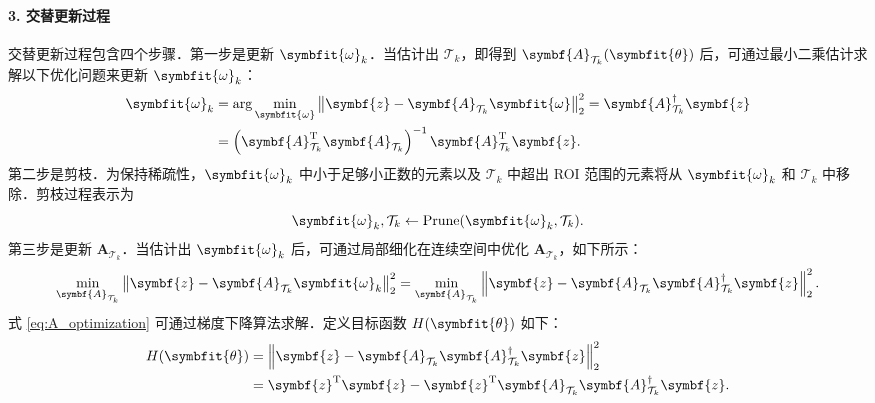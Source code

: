 \documentclass[a4paper,zihao=-4]{ctexart}
\renewcommand{\mathbf}[1]{\symbf{#1}}
\renewcommand{\boldsymbol}[1]{\symbfit{#1}}
\begin{document}
\paragraph{3. 交替更新过程}
交替更新过程包含四个步骤．第一步是更新 $\boldsymbol{\omega}_k$．当估计出 $\mathcal{T}_k$，即得到 $\mathbf{A}_{\mathcal{T}_k}(\boldsymbol{\theta})$ 后，可通过最小二乘估计求解以下优化问题来更新 $\boldsymbol{\omega}_k$：
\begin{equation}
    \label{eq:omega_update}
    \begin{aligned}
        \boldsymbol{\omega}_k &= \arg\min_{\boldsymbol{\omega}} \left\| \mathbf{z} - \mathbf{A}_{\mathcal{T}_k} \boldsymbol{\omega} \right\|_2^2 = \mathbf{A}_{\mathcal{T}_k}^{\dagger} \mathbf{z} \\
        &= \left( \mathbf{A}_{\mathcal{T}_k}^{\mathrm{T}} \mathbf{A}_{\mathcal{T}_k} \right)^{-1} \mathbf{A}_{\mathcal{T}_k}^{\mathrm{T}} \mathbf{z}.
    \end{aligned}
\end{equation}
第二步是剪枝．为保持稀疏性，$\boldsymbol{\omega}_k$ 中小于足够小正数的元素以及 $\mathcal{T}_k$ 中超出 ROI 范围的元素将从 $\boldsymbol{\omega}_k$ 和 $\mathcal{T}_k$ 中移除．剪枝过程表示为
\begin{equation}
    \label{eq:prune}
    \boldsymbol{\omega}_k, \mathcal{T}_k \leftarrow \operatorname{Prune}(\boldsymbol{\omega}_k, \mathcal{T}_k).
\end{equation}
第三步是更新 $\mathbf{A}_{\mathcal{T}_k}$．当估计出 $\boldsymbol{\omega}_k$ 后，可通过局部细化在连续空间中优化 $\mathbf{A}_{\mathcal{T}_k}$，如下所示：
\begin{equation}
    \label{eq:A_optimization}
    \min_{\mathbf{A}_{\mathcal{T}_k}} \left\| \mathbf{z} - \mathbf{A}_{\mathcal{T}_k} \boldsymbol{\omega}_k \right\|_2^2 = \min_{\mathbf{A}_{\mathcal{T}_k}} \left\| \mathbf{z} - \mathbf{A}_{\mathcal{T}_k} \mathbf{A}_{\mathcal{T}_k}^{\dagger} \mathbf{z} \right\|_2^2.
\end{equation}
式 \eqref{eq:A_optimization} 可通过梯度下降算法求解．定义目标函数 $H(\boldsymbol{\theta})$ 如下：
\begin{equation}
    \label{eq:objective_H}
    \begin{aligned}
        H(\boldsymbol{\theta}) &= \left\| \mathbf{z} - \mathbf{A}_{\mathcal{T}_k} \mathbf{A}_{\mathcal{T}_k}^{\dagger} \mathbf{z} \right\|_2^2 \\
        &= \mathbf{z}^{\mathrm{T}} \mathbf{z} - \mathbf{z}^{\mathrm{T}} \mathbf{A}_{\mathcal{T}_k} \mathbf{A}_{\mathcal{T}_k}^{\dagger} \mathbf{z}.
    \end{aligned}
\end{equation}
\end{document}
